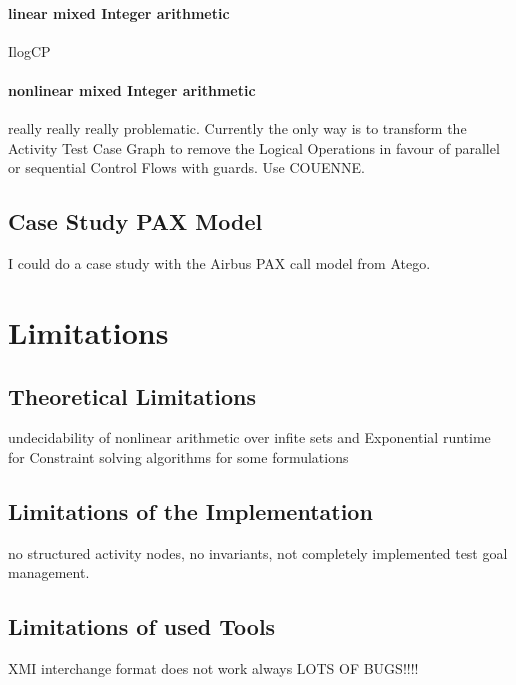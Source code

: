 \paragraph{linear mixed Integer arithmetic} IlogCP
\paragraph{nonlinear mixed Integer arithmetic}
really really really problematic. Currently the only way is to transform the Activity Test Case Graph to remove the Logical Operations in favour of parallel or sequential Control Flows with guards. Use COUENNE.
\subsection{Case Study PAX Model}
I could do a case study with the Airbus PAX call model from Atego.
\section{Limitations}
\subsection{Theoretical Limitations}
undecidability of nonlinear arithmetic over infite sets and Exponential runtime for Constraint solving algorithms for some formulations
\subsection{Limitations of the Implementation}
no structured activity nodes, no invariants, not completely implemented test goal management.
\subsection{Limitations of used Tools}
XMI interchange format does not work always LOTS OF BUGS!!!!


